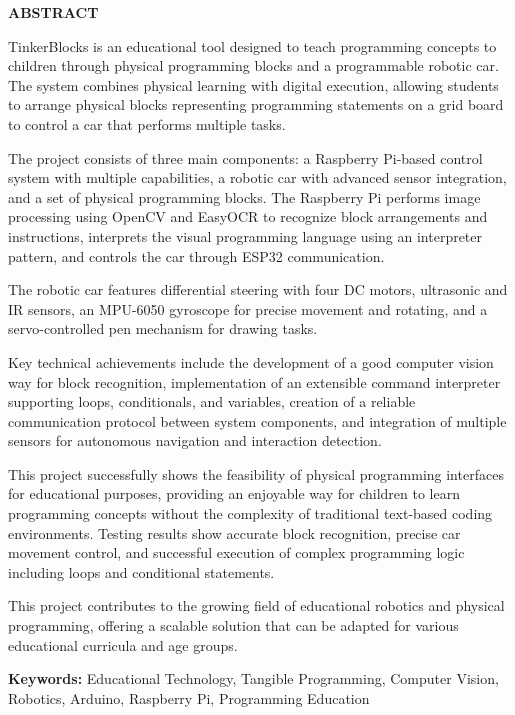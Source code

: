 \begin{center}
\Large \textbf{ABSTRACT}
\end{center}

\vspace{1cm}

TinkerBlocks is an educational tool designed to teach programming concepts to children through physical programming blocks and a programmable robotic car. The system combines physical learning with digital execution, allowing students to arrange physical blocks representing programming statements on a grid board to control a car that performs multiple tasks.

The project consists of three main components: a Raspberry Pi-based control system with multiple capabilities, a robotic car with advanced sensor integration, and a set of physical programming blocks. The Raspberry Pi performs image processing using OpenCV and EasyOCR to recognize block arrangements and instructions, interprets the visual programming language using an interpreter pattern, and controls the car through ESP32 communication.

The robotic car features differential steering with four DC motors, ultrasonic and IR sensors, an MPU-6050 gyroscope for precise movement and rotating, and a servo-controlled pen mechanism for drawing tasks.

Key technical achievements include the development of a good computer vision way for block recognition, implementation of an extensible command interpreter supporting loops, conditionals, and variables, creation of a reliable communication protocol between system components, and integration of multiple sensors for autonomous navigation and interaction detection.

This project successfully shows the feasibility of physical programming interfaces for educational purposes, providing an enjoyable way for children to learn programming concepts without the complexity of traditional text-based coding environments. Testing results show accurate block recognition, precise car movement control, and successful execution of complex programming logic including loops and conditional statements.

This project contributes to the growing field of educational robotics and physical programming, offering a scalable solution that can be adapted for various educational curricula and age groups.

\textbf{Keywords:} Educational Technology, Tangible Programming, Computer Vision, Robotics, Arduino, Raspberry Pi, Programming Education